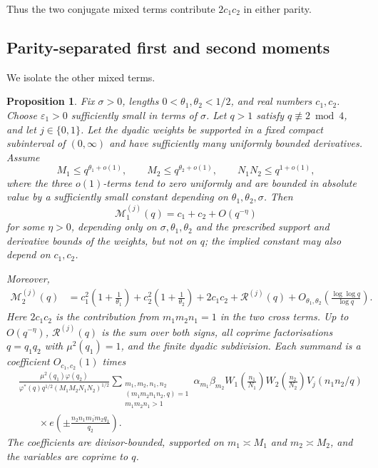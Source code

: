 \documentclass[12pt, a4paper]{amsart}
\numberwithin{equation}{section}
\newcommand{\e}{e}
\renewcommand{\le}{\leqslant}
\theoremstyle{plain}
\newtheorem{prop}[lem]{Proposition}
\begin{document}
Thus the two conjugate mixed terms contribute $2c_1c_2$ in either parity.

\subsection{Parity-separated first and second moments}
\label{sec:fixed-parity-qw-reduction}

We isolate the other mixed terms.

\begin{prop}\label{prop:fixed-parity-qw-setup}
Fix $\sigma>0$, lengths $0<\theta_1,\theta_2<1/2$, and real numbers $c_1,c_2$. Choose $\varepsilon_1>0$ sufficiently small in terms of $\sigma$. Let $q>1$ satisfy $q\not\equiv2\bmod4$, and let $j\in\{0,1\}$. Let the dyadic weights be supported in a fixed compact subinterval of $(0,\infty)$ and have sufficiently many uniformly bounded derivatives. Assume
$$
M_1\le q^{\theta_1+o(1)},\qquad
M_2\le q^{\theta_2+o(1)},\qquad
N_1N_2\le q^{1+o(1)},
$$
where the three $o(1)$-terms tend to zero uniformly and are bounded in absolute value by a sufficiently small constant depending on $\theta_1,\theta_2,\sigma$. Then
$$
\mathcal M_1^{(j)}(q)=c_1+c_2+O(q^{-\eta})
$$
for some $\eta>0$, depending only on $\sigma,\theta_1,\theta_2$ and the prescribed support and derivative bounds of the weights, but not on $q$; the implied constant may also depend on $c_1,c_2$.

Moreover,
$$
\begin{aligned}
\mathcal M_2^{(j)}(q)
&=
c_1^2\left(1+\frac{1}{\theta_1}\right)
+c_2^2\left(1+\frac{1}{\theta_2}\right)
+2c_1c_2+\mathcal R^{(j)}(q)
+O_{\theta_1,\theta_2}\left(\frac{\log\log q}{\log q}\right).
\end{aligned}
$$
Here $2c_1c_2$ is the contribution from $m_1m_2n_1=1$ in the two cross terms. Up to $O(q^{-\eta})$, $\mathcal R^{(j)}(q)$ is the sum over both signs, all coprime factorisations $q=q_1q_2$ with $\mu^2(q_1)=1$, and the finite dyadic subdivision. Each summand is a coefficient $O_{c_1,c_2}(1)$ times
$$
\begin{aligned}
&\frac{\mu^2(q_1)\varphi(q_2)}
{\varphi^*(q)q^{1/2}(M_1M_2N_1N_2)^{1/2}}
\sum_{\substack{m_1,m_2,n_1,n_2\\ (m_1m_2n_1n_2,q)=1\\ m_1m_2n_1>1}}
\alpha_{m_1}\beta_{m_2}
W_1\left(\frac{n_1}{N_1}\right)W_2\left(\frac{n_2}{N_2}\right)V_j(n_1n_2/q)\\
&\qquad\times\e\left(\pm \frac{n_2\overline{n_1m_1m_2q_1}}{q_2}\right).
\end{aligned}
$$
The coefficients are divisor-bounded, supported on $m_1\asymp M_1$ and $m_2\asymp M_2$, and the variables are coprime to $q$.
\end{prop}
\end{document}
